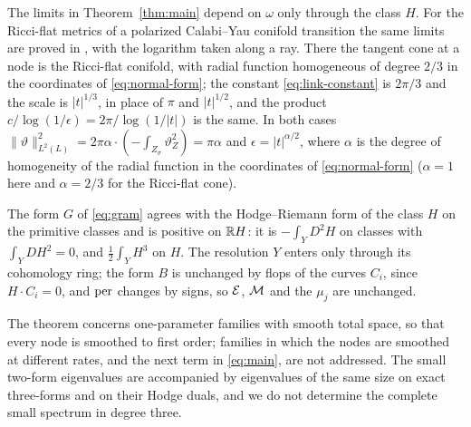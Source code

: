 \begin{remark}\label{rem:metric}
The limits in Theorem~\ref{thm:main} depend on $\omega$ only through the
class $H$. For the Ricci-flat metrics of a polarized Calabi--Yau conifold
transition the same limits are proved in \cite{wuebben-conifold}, with the
logarithm taken along a ray. There the tangent cone at a node is the
Ricci-flat conifold, with radial function homogeneous of degree $2/3$ in
the coordinates of \eqref{eq:normal-form}; the constant
\eqref{eq:link-constant} is $2\pi/3$ and the scale is $|t|^{1/3}$, in
place of $\pi$ and $|t|^{1/2}$, and the product
$c/\log(1/\epsilon)=2\pi/\log(1/|t|)$ is the same. In both cases
$\|\vartheta\|^2_{L^2(L)}=2\pi\alpha\cdot(-\int_{Z_\sigma}\vartheta_Z^2)
=\pi\alpha$ and $\epsilon=|t|^{\alpha/2}$, where $\alpha$ is the degree of
homogeneity of the radial function in the coordinates of
\eqref{eq:normal-form} ($\alpha=1$ here and $\alpha=2/3$ for the
Ricci-flat cone).
\end{remark}

\begin{remark}\label{rem:G}
The form $G$ of \eqref{eq:gram} agrees with the Hodge--Riemann form of
the class $H$ on the primitive classes and is positive on $\mathbb R H$: it is $-\int_YD^2H$ on classes
with $\int_YDH^2=0$, and $\tfrac12\int_YH^3$ on $H$. The resolution $Y$ enters
only through its cohomology ring; the form $B$ is unchanged by flops of
the curves $C_i$, since $H\cdot C_i=0$, and $\operatorname{per}$ changes by signs, so $\mathcal E$, $\mathcal M$ and the
$\mu_j$ are unchanged.
\end{remark}

\begin{remark}[Scope]\label{rem:scope}
The theorem concerns one-parameter families with smooth total space, so
that every node is smoothed to first order; families in which the nodes
are smoothed at different rates, and the next term in
\eqref{eq:main}, are not addressed. The small two-form eigenvalues are
accompanied by eigenvalues of the same size on exact three-forms and on
their Hodge duals, and we do not determine the complete small spectrum in
degree three.
\end{remark}

